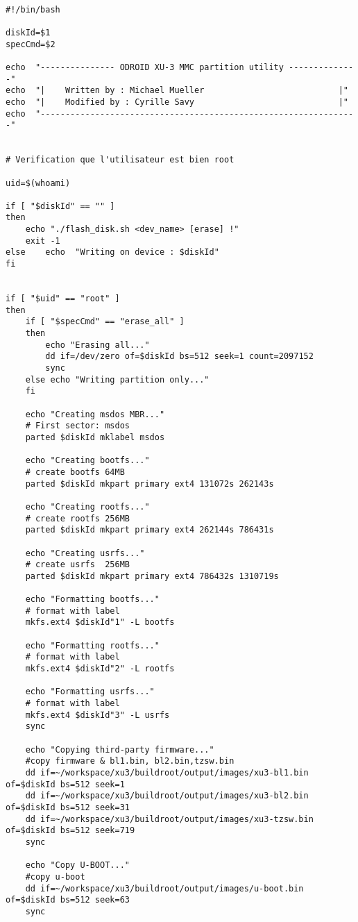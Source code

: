 \begin{lstlisting}[frame=single,style=Console]  % Start your code-block

#!/bin/bash

diskId=$1
specCmd=$2

echo  "--------------- ODROID XU-3 MMC partition utility --------------"
echo  "| 	Written by : Michael Mueller                           |"
echo  "| 	Modified by : Cyrille Savy                             |"
echo  "----------------------------------------------------------------"


# Verification que l'utilisateur est bien root

uid=$(whoami)

if [ "$diskId" == "" ]
then
	echo "./flash_disk.sh <dev_name> [erase] !"
	exit -1
else 	echo  "Writing on device : $diskId" 
fi


if [ "$uid" == "root" ]
then
	if [ "$specCmd" == "erase_all" ]
	then
		echo "Erasing all..."
		dd if=/dev/zero of=$diskId bs=512 seek=1 count=2097152
		sync
	else echo "Writing partition only..."
	fi

	echo "Creating msdos MBR..."
	# First sector: msdos
	parted $diskId mklabel msdos

	echo "Creating bootfs..."
	# create bootfs 64MB
	parted $diskId mkpart primary ext4 131072s 262143s

	echo "Creating rootfs..."
	# create rootfs 256MB
	parted $diskId mkpart primary ext4 262144s 786431s

	echo "Creating usrfs..."
	# create usrfs  256MB
	parted $diskId mkpart primary ext4 786432s 1310719s  
	
	echo "Formatting bootfs..."
	# format with label
 	mkfs.ext4 $diskId"1" -L bootfs

	echo "Formatting rootfs..."
	# format with label
 	mkfs.ext4 $diskId"2" -L rootfs

	echo "Formatting usrfs..."
	# format with label
 	mkfs.ext4 $diskId"3" -L usrfs
	sync

	echo "Copying third-party firmware..."
	#copy firmware & bl1.bin, bl2.bin,tzsw.bin
	dd if=~/workspace/xu3/buildroot/output/images/xu3-bl1.bin of=$diskId bs=512 seek=1  
	dd if=~/workspace/xu3/buildroot/output/images/xu3-bl2.bin of=$diskId bs=512 seek=31 
	dd if=~/workspace/xu3/buildroot/output/images/xu3-tzsw.bin of=$diskId bs=512 seek=719 
	sync

	echo "Copy U-BOOT..."
	#copy u-boot
	dd if=~/workspace/xu3/buildroot/output/images/u-boot.bin of=$diskId bs=512 seek=63 
	sync


\end{lstlisting}
